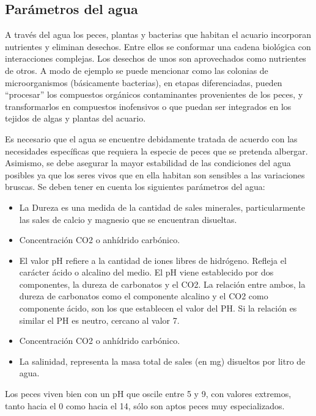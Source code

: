 \subsection{Parámetros del agua}

A través del agua los peces, plantas y bacterias que habitan el acuario incorporan nutrientes y eliminan desechos. Entre ellos se conformar una cadena biológica con interacciones complejas. Los desechos de unos son aprovechados como nutrientes de otros.  A modo de ejemplo se puede mencionar como las colonias de microorganismos (básicamente bacterias), en etapas diferenciadas, pueden ``procesar'' los compuestos orgánicos contaminantes provenientes de los peces, y transformarlos en compuestos inofensivos o que puedan ser integrados en los tejidos de algas y plantas del acuario. \citep{teton2003}


Es necesario que el agua se encuentre debidamente tratada de acuerdo con las necesidades específicas que requiera la especie de peces que se pretenda albergar.  Asimismo, se debe asegurar la mayor estabilidad de las condiciones del agua posibles ya que los seres vivos que en ella habitan son sensibles a las variaciones bruscas.  Se deben tener en cuenta los siguientes parámetros del agua:

\begin{itemize}
		\item La Dureza es una medida de la cantidad de sales minerales, particularmente las sales de calcio y magnesio que se encuentran disueltas.
		\item Concentración CO2  o anhídrido carbónico.
		\item El valor pH refiere a la cantidad de iones libres de hidrógeno. Refleja el carácter ácido o alcalino del medio. El pH viene establecido por dos componentes, la dureza de carbonatos y el CO2. La relación entre ambos, la dureza de carbonatos como el componente alcalino y el CO2 como componente ácido, son los que establecen el valor del PH. Si la relación es similar el PH es neutro, cercano al valor 7.
		\item Concentración CO2  o anhídrido carbónico.
		\item La salinidad, representa la masa total de sales (en mg) disueltos por litro de agua.
\end{itemize}


Los peces viven bien con un pH que oscile entre 5 y 9, con valores extremos, tanto hacia el 0 como hacia el 14, sólo son aptos peces muy especializados.

